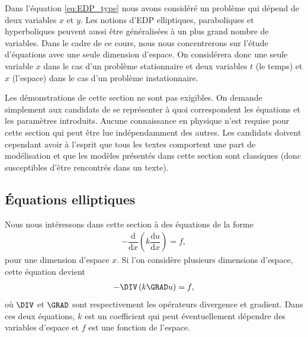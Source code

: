\documentclass[12pt,a4paper,twoside]{article}
\begin{document}
Dans l'\'equation \eqref{eq:EDP_type}
nous avons consid\'er\'e un probl\`eme qui d\'epend de deux
variables $x$ et $y$. 
Les notions d'EDP elliptiques, paraboliques et hyperboliques peuvent
aussi \^etre g\'en\'eralis\'ees \`a un plus grand nombre de variables.
Dans le cadre de ce cours, nous nous concentrerons 
sur l'\'etude d'\'equations
avec une seule dimension d'espace.
On consid\'erera donc une seule variable $x$ dans le cas d'un probl\`eme stationnaire
et deux variables $t$ (le temps) et $x$ (l'espace) dans le cas d'un probl\`eme
instationnaire.




\begin{remark}
  Les d\'emonstrations de cette section ne sont pas exigibles.
  On demande simplement aux candidats de se repr\'esenter \`a quoi
  correspondent les \'equations et les param\`etres introduits.
  Aucune connaissance en physique n'est requise pour cette section
  qui peut \^etre lue ind\'ependamment des autres.
  Les candidats doivent cependant avoir \`a l'esprit que tous les textes
  comportent une part de mod\'elisation et que les mod\`eles pr\'esent\'es dans cette
  section sont classiques (donc susceptibles d'\^etre rencontr\'es dans un texte).
\end{remark}



\subsection{\'Equations elliptiques}
\label{subsec:elliptique}

Nous nous int\'eressons dans cette section \`a des \'equations de la forme
\begin{align}
  \label{eq:ell_1D}
  - \dfrac{\mathrm{d}}{\mathrm{d} x} \left(k \dfrac{\mathrm{d} u}{\mathrm{d} x} \right) = f ,
\end{align}
pour une dimension d'espace $x$.
Si l'on consid\`ere plusieurs dimensions d'espace, cette \'equation devient
\begin{align}
  \label{eq:ell_2D}
  - \DIV \left(k \GRAD u \right) = f ,
\end{align}
o\`u $\DIV$ et $\GRAD$ sont respectivement les op\'erateurs divergence et gradient.
Dans ces deux \'equations, $k$ est un coefficient qui peut \'eventuellement d\'ependre 
des variables d'espace et $f$ est une fonction de l'espace.
\end{document}
